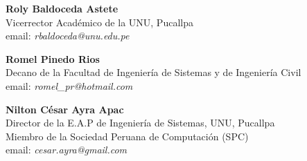 \begin{center}
\textbf{Roly Baldoceda Astete}\\
Vicerrector Académico de la UNU, Pucallpa\\
email: \textit{rbaldoceda@unu.edu.pe}\\
\end{center}

\begin{center}
\textbf{Romel Pinedo Rios}\\
Decano de la Facultad de Ingeniería de Sistemas y de Ingeniería Civil\\
email: \textit{romel\_pr@hotmail.com}\\
\end{center}

\begin{center}
\textbf{Nilton César Ayra Apac}\\
Director de la E.A.P de Ingeniería de Sistemas, UNU, Pucallpa\\
Miembro de la Sociedad Peruana de Computación (SPC)\\
email: \textit{cesar.ayra@gmail.com}\\
\end{center}

\newpage
